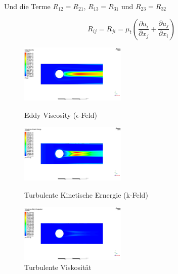 Und die Terme $R_{12} = R_{21}$, $R_{13} = R_{31}$ und $R_{23} = R_{32}$

\begin{equation}
    R_{ij} = R_{ji} = \mu_t \left(\frac{\partial u_i}{\partial x_j} + \frac{\partial u_j}{\partial x_i}\right)
\end{equation}

\begin{figure}
  \centering
  \includegraphics[width=0.45\textwidth]{papers/reynolds/images/eddy-viscosity.png}
  \caption{Eddy Viscosity ($\epsilon$-Feld)}
  \label{fig:e}
  \centering
  \includegraphics[width=0.45\textwidth]{papers/reynolds/images/turbulence-kinetic-energy.png}
  \caption{Turbulente Kinetische Ernergie (k-Feld)}
  \label{fig:k}
  \centering
  \includegraphics[width=0.45\textwidth]{papers/reynolds/images/turbulent-viscosity.png}
  \caption{Turbulente Viskosität}
  \label{fig:mu-t}
\end{figure}